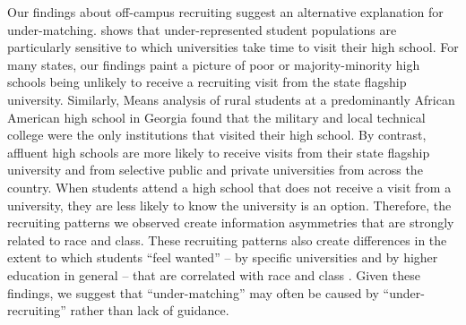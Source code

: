\documentclass[twoside]{article}
\begin{document}
Our findings about off-campus recruiting suggest an alternative explanation for under-matching. \cite{RN4324} shows that under-represented student populations are particularly sensitive to which universities take time to visit their high school.  For many states, our findings paint a picture of poor or majority-minority high schools being unlikely to receive a recruiting visit from the state flagship university. Similarly, Means \cite{RN4420} analysis of rural students at a predominantly African American high school in Georgia found that the military and local technical college were the only institutions that visited their high school. By contrast, affluent high schools are more likely to receive visits from their state flagship university and from selective public and private universities from across the country.  When students attend a high school that does not receive a visit from a university, they are less likely to know the university is an option.  Therefore, the recruiting patterns we observed create information asymmetries that are strongly related to race and class.  These recruiting patterns also create differences in the extent to which students ``feel wanted'' -- by specific universities and by higher education in general -- that are correlated with race and class \citep{RN4324}.  Given these findings, we suggest that ``under-matching'' may often be caused by ``under-recruiting'' rather than lack of guidance.
\end{document}
